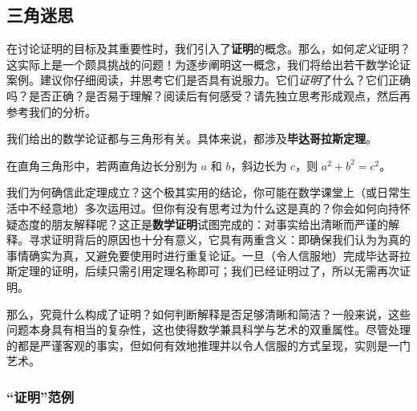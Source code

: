 \subsection{三角迷思}\label{sec:section1.1.1}

在讨论证明的目标及其重要性时，我们引入了\textbf{证明}的概念。那么，如何\emph{定义}证明？这实际上是一个颇具挑战的问题！为逐步阐明这一概念，我们将给出若干数学论证案例。建议你仔细阅读，并思考它们是否具有说服力。它们\emph{证明}了什么？它们正确吗？是否正确？是否易于理解？阅读后有何感受？请先独立思考形成观点，然后再参考我们的分析。

我们给出的数学论证都与三角形有关。具体来说，都涉及\textbf{毕达哥拉斯定理}。

\begin{theorem}[毕达哥拉斯定理] \label{thm:pythagorean}
    在直角三角形中，若两直角边长分别为 $a$ 和 $b$，斜边长为 $c$，则 $a^2+b^2=c^2$。
\end{theorem}

\begin{center}
\end{center}

我们为何确信此定理成立？这个极其实用的结论，你可能在数学课堂上（或日常生活中不经意地）多次运用过。但你有没有思考过为什么这是真的？你会如何向持怀疑态度的朋友解释呢？这正是\textbf{数学证明}试图完成的：对事实给出清晰而严谨的解释。寻求证明背后的原因也十分有意义，它具有两重含义：即确保我们认为为真的事情确实为真，又避免要使用时进行重复论证。一旦（令人信服地）完成毕达哥拉斯定理的证明，后续只需引用定理名称即可；我们已经证明过了，所以无需再次证明。

那么，究竟什么构成了证明？如何判断解释是否足够清晰和简洁？一般来说，这些问题本身具有相当的复杂性，这也使得数学兼具科学与艺术的双重属性。尽管处理的都是严谨客观的事实，但如何有效地推理并以令人信服的方式呈现，实则是一门艺术。

\subsubsection*{``证明''范例}

